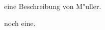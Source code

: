 \documentclass{article}
\begin{document}
\begin{description}[format=\itshape]
\item[Gr"o"se] eine Beschreibung von M"uller.
\item[F"ur "Ubertragung] noch eine.
\end{description}
\end{document}
